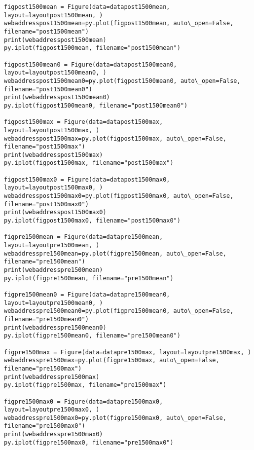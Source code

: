 \documentclass{article}
\begin{document}
    \begin{Verbatim}[commandchars=\\\{\}]
figpost1500mean = Figure(data=datapost1500mean, layout=layoutpost1500mean, )
webaddresspost1500mean=py.plot(figpost1500mean, auto\_open=False, filename="post1500mean")
print(webaddresspost1500mean)
py.iplot(figpost1500mean, filename="post1500mean")

figpost1500mean0 = Figure(data=datapost1500mean0, layout=layoutpost1500mean0, )
webaddresspost1500mean0=py.plot(figpost1500mean0, auto\_open=False, filename="post1500mean0")
print(webaddresspost1500mean0)
py.iplot(figpost1500mean0, filename="post1500mean0")

figpost1500max = Figure(data=datapost1500max, layout=layoutpost1500max, )
webaddresspost1500max=py.plot(figpost1500max, auto\_open=False, filename="post1500max")
print(webaddresspost1500max)
py.iplot(figpost1500max, filename="post1500max")

figpost1500max0 = Figure(data=datapost1500max0, layout=layoutpost1500max0, )
webaddresspost1500max0=py.plot(figpost1500max0, auto\_open=False, filename="post1500max0")
print(webaddresspost1500max0)
py.iplot(figpost1500max0, filename="post1500max0")

figpre1500mean = Figure(data=datapre1500mean, layout=layoutpre1500mean, )
webaddresspre1500mean=py.plot(figpre1500mean, auto\_open=False, filename="pre1500mean")
print(webaddresspre1500mean)
py.iplot(figpre1500mean, filename="pre1500mean")

figpre1500mean0 = Figure(data=datapre1500mean0, layout=layoutpre1500mean0, )
webaddresspre1500mean0=py.plot(figpre1500mean0, auto\_open=False, filename="pre1500mean0")
print(webaddresspre1500mean0)
py.iplot(figpre1500mean0, filename="pre1500mean0")

figpre1500max = Figure(data=datapre1500max, layout=layoutpre1500max, )
webaddresspre1500max=py.plot(figpre1500max, auto\_open=False, filename="pre1500max")
print(webaddresspre1500max)
py.iplot(figpre1500max, filename="pre1500max")

figpre1500max0 = Figure(data=datapre1500max0, layout=layoutpre1500max0, )
webaddresspre1500max0=py.plot(figpre1500max0, auto\_open=False, filename="pre1500max0")
print(webaddresspre1500max0)
py.iplot(figpre1500max0, filename="pre1500max0")
    \end{Verbatim}
\end{document}

